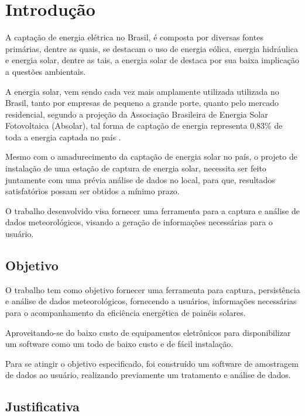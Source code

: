 \nocite{ddd_eric_evans}
\nocite{gof_patterns}
\nocite{sonda_project}
\nocite{nosql_distilled}
\nocite{js_async}

\chapter{Introdução}

A captação de energia elétrica no Brasil, é composta por diversas fontes primárias, dentre as quais, se destacam o uso de energia eólica, energia hidráulica e energia solar, dentre as tais, a energia solar de destaca por sua baixa implicação a questões ambientais.

A energia solar, vem sendo cada vez mais amplamente utilizada utilizada no Brasil, tanto por empresas de pequeno a grande porte, quanto pelo mercado residencial, segundo a projeção da Associação Brasileira de Energia Solar Fotovoltaica (Absolar), tal forma de captação de energia representa 0,83\% de toda a energia captada no país \cite{maturidade_absolar}.

Mesmo com o amadurecimento da captação de energia solar no país, o projeto de instalação de uma estação de captura de energia solar, necessita ser feito juntamente com uma prévia análise de dados no local, para que, resultados satisfatórios possam ser obtidos a mínimo prazo.

O trabalho desenvolvido visa fornecer uma ferramenta para a captura e análise de dados meteorológicos, visando a geração de informações necessárias para o usuário.

\section{Objetivo}

O trabalho tem como objetivo fornecer uma ferramenta para captura, persistência e análise de dados meteorológicos, fornecendo a usuários, informações necessárias para o acompanhamento da eficiência energética de painéis solares.

Aproveitando-se do baixo custo de equipamentos eletrônicos para disponibilizar um software como um todo de baixo custo e de fácil instalação.

Para se atingir o objetivo especificado, foi construído um software de amostragem de dados ao usuário, realizando previamente um tratamento e análise de dados.

\section{Justificativa}

